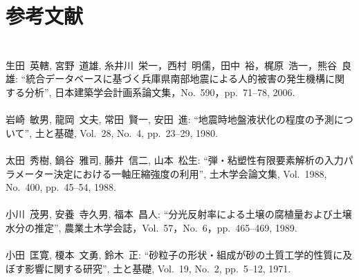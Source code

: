 \chapter*{参考文献}
\lhead[参考文献]{}
\thispagestyle{empty}

\newpage

\subsection*{}
\begin{mythebibliography}{}

\leavevmode \\生田~英轄, 宮野~道雄, 糸井川~栄一，西村~明儒，田中~裕，梶原~浩一，熊谷~良雄:
\newblock ``統合データベースに基づく兵庫県南部地震による人的被害の発生機構に関する分析'',
\newblock 日本建築学会計画系論文集，No.~590，pp.~71--78, 2006.
\\

\leavevmode \\岩崎~敏男, 龍岡~文夫, 常田~賢一, 安田~進:
\newblock ``地震時地盤液状化の程度の予測について'',
\newblock 土と基礎, Vol.~28, No.~4, pp.~23--29, 1980.
\\

\leavevmode \\太田~秀樹, 鍋谷~雅司, 藤井~信二, 山本~松生:
\newblock ``弾・粘塑性有限要素解析の入力パラメーター決定における一軸圧縮強度の利用'',
\newblock 土木学会論文集, Vol.~1988, No.~400, pp.~45--54, 1988.
\\

\leavevmode \\小川~茂男, 安養~寺久男, 福本~昌人:
\newblock ``分光反射率による土壌の腐植量および土壌水分の推定'',
\newblock 農業土木学会誌，Vol.~57，No.~6，pp.~465--469, 1989.
\\

\leavevmode \\小田~匡寛, 榎本~文勇, 鈴木~正:
\newblock ``砂粒子の形状・組成が砂の土質工学的性質に及ぼす影響に関する研究'',
\newblock 土と基礎, Vol.~19, No.~2, pp.~5--12, 1971.
\\


\end{mythebibliography}
